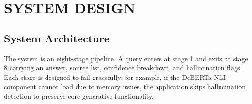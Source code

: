 \chapter{\MakeUppercase{System Design}}

\section{System Architecture}

The system is an eight-stage pipeline. A query enters at stage 1 and exits at stage 8 carrying an answer, source list, confidence breakdown, and hallucination flags. Each stage is designed to fail gracefully; for example, if the DeBERTa NLI component cannot load due to memory issues, the application skips hallucination detection to preserve core generative functionality.

